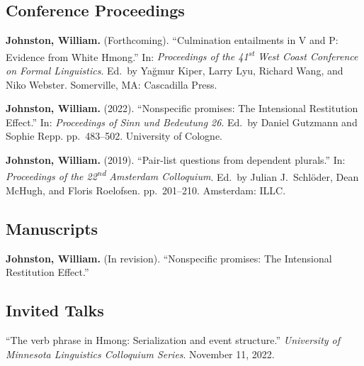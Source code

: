 \documentclass[11pt,oneside,DIV=9,parskip=off]{scrarticle} %
\newlength{\spacingbefore}
\newlength{\spacingafter}
\newcommand{\myonecol}[1]{%
	\vspace{\spacingbefore}%
	\begin{minipage}[t]{\linewidth}%
		\strut#1%
	\end{minipage}%
	\vspace{\spacingafter}\par%
	}
\newcommand{\pub}[1]{%
	\myonecol{#1}%
	}
\newcommand{\talk}[1]{%
	\myonecol{#1}%
	}
\begin{document}

\subsection{Conference Proceedings}
\pub{\textbf{Johnston, William.} (Forthcoming). ``Culmination entailments in V and P: Evidence from White Hmong.'' In: \textit{Proceedings of the 41\textsuperscript{st} West Coast Conference on Formal Linguistics}. Ed.\ by Yağmur Kiper, Larry Lyu, Richard Wang, and Niko Webster. Somerville, MA: Cascadilla Press.}
\pub{\textbf{Johnston, William.} (2022). ``Nonspecific promises: The Intensional Restitution Effect.'' In: \textit{Proceedings of Sinn und Bedeutung 26}. Ed.\ by Daniel Gutzmann and Sophie Repp. pp.\ 483--502. University of Cologne.}
\pub{\textbf{Johnston, William.} (2019). ``Pair-list questions from dependent plurals.'' In: \textit{Proceedings of the 22\textsuperscript{nd} Amsterdam Colloquium}. Ed.\ by Julian J.\ Schl\"oder, Dean McHugh, and Floris Roelofsen. pp.\ 201--210. Amsterdam: ILLC.}



\subsection{Manuscripts}
\pub{\textbf{Johnston, William.} (In revision). ``Nonspecific promises: The Intensional Restitution Effect.''}

\subsection{Invited Talks}
\talk{``The verb phrase in Hmong: Serialization and event structure.'' \textit{University of Minnesota Linguistics Colloquium Series}. November 11, 2022.}

\end{document}
